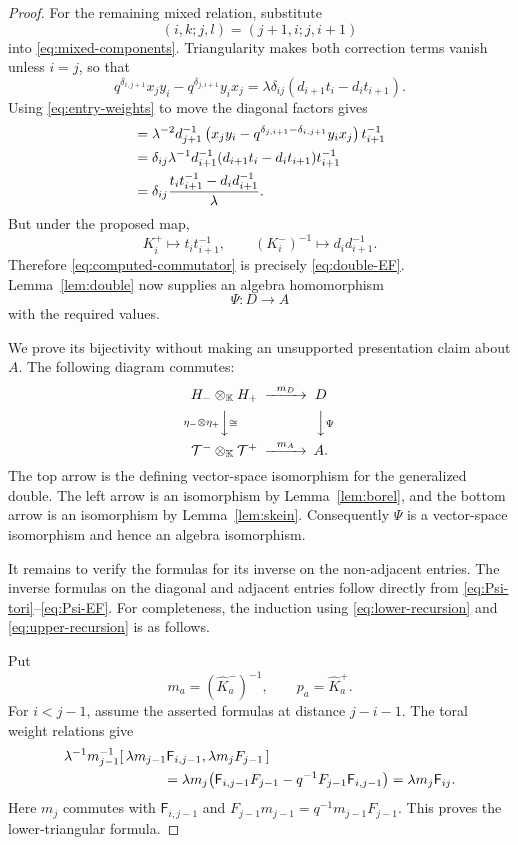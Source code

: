 \documentclass[11pt]{amsart}
\theoremstyle{remark}
\newcommand{\kk}{\mathbb{K}}
\begin{document}
\begin{proof}
For the remaining mixed relation, substitute
\[
 (i,k;j,l)=(j+1,i;j,i+1)
\]
into \eqref{eq:mixed-components}.  Triangularity makes both
correction terms vanish unless $i=j$, so that
\begin{equation}\label{eq:simple-mixed}
 q^{\delta_{i,j+1}}x_jy_i
 -q^{\delta_{j,i+1}}y_ix_j
 =\lambda\delta_{ij}(d_{i+1}t_i-d_it_{i+1}).
\end{equation}
Using \eqref{eq:entry-weights} to move the diagonal factors gives
\begin{align}
 [\mathcal E_i,\mathcal F_j]
 &=
 \lambda^{-2}d_{j+1}^{-1}
 \left(
   x_jy_i
   -q^{\delta_{j,i+1}-\delta_{i,j+1}}y_ix_j
 \right)t_{i+1}^{-1}
 \notag\\
 &=
 \delta_{ij}\lambda^{-1}
       d_{i+1}^{-1}(d_{i+1}t_i-d_it_{i+1})t_{i+1}^{-1}
 \notag\\
 &=\delta_{ij}\frac{
          t_it_{i+1}^{-1}-d_id_{i+1}^{-1}
        }{\lambda}.
 \label{eq:computed-commutator}
\end{align}
But under the proposed map,
\[
 K_i^+\longmapsto t_it_{i+1}^{-1},
 \qquad
 (K_i^-)^{-1}\longmapsto d_id_{i+1}^{-1}.
\]
Therefore \eqref{eq:computed-commutator} is precisely
\eqref{eq:double-EF}.  Lemma~\ref{lem:double} now supplies an
algebra homomorphism
\[
 \Psi:D\longrightarrow A
\]
with the required values.

We prove its bijectivity without making an unsupported
presentation claim about $A$.  The following diagram commutes:
\[
\begin{CD}
 H_-\otimes_\kk H_+ @>{m_D}>> D\\
 @V{\eta_-\otimes\eta_+}V{\cong}V @VV{\Psi}V\\
 \mathcal T^-\otimes_\kk\mathcal T^+
       @>{m_A}>> A .
\end{CD}
\]
The top arrow is the defining vector-space isomorphism for the
generalized double.  The left arrow is an isomorphism by
Lemma~\ref{lem:borel}, and the bottom arrow is an isomorphism by
Lemma~\ref{lem:skein}.  Consequently $\Psi$ is a vector-space
isomorphism and hence an algebra isomorphism.

It remains to verify the formulas for its inverse on the
non-adjacent entries.  The inverse formulas on the diagonal and
adjacent entries follow directly from
\eqref{eq:Psi-tori}--\eqref{eq:Psi-EF}.  For completeness, the
induction using \eqref{eq:lower-recursion} and
\eqref{eq:upper-recursion} is as follows.

Put
\[
 m_a=(\widehat K_a^-)^{-1},
 \qquad p_a=\widehat K_a^+.
\]
For $i<j-1$, assume the asserted formulas at distance $j-i-1$.
The toral weight relations give
\[
 \begin{split}
 &\lambda^{-1}m_{j-1}^{-1}
   [\,\lambda m_{j-1}\mathsf F_{i,j-1},
      \lambda m_jF_{j-1}\,]\\
 &\hspace{25mm}
 =\lambda m_j
    \bigl(\mathsf F_{i,j-1}F_{j-1}
            -q^{-1}F_{j-1}\mathsf F_{i,j-1}\bigr)
 =\lambda m_j\mathsf F_{ij}.
 \end{split}
\]
Here $m_j$ commutes with $\mathsf F_{i,j-1}$ and
$F_{j-1}m_{j-1}=q^{-1}m_{j-1}F_{j-1}$.
This proves the lower-triangular formula.


\end{proof}
\end{document}
